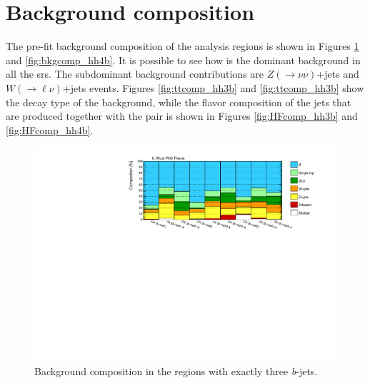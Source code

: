 \section{Background composition}
\label{sec:ewk:bkgcomp}

The pre-fit background composition of the analysis regions is shown in Figures \ref{fig:bkgcomp_hh3b} and \ref{fig:bkgcomp_hh4b}.
It is possible to see how \ttbar is the dominant background in all the \glspl{sr}.
The subdominant background contributions are $Z(\to \nu\nu)$+jets and $W(\to \ell\nu)$+jets events.
Figures \ref{fig:ttcomp_hh3b} and \ref{fig:ttcomp_hh3b} show the decay type of the \ttbar background,
while the flavor composition of the jets that are produced together with the \ttbar pair is shown 
in Figures \ref{fig:HFcomp_hh3b} and \ref{fig:HFcomp_hh4b}.

\begin{figure}[htbp]
\includegraphics[width=\textwidth]{figures/ewk_prod/comp_plots/hh_3b_bkg.pdf}
\caption{Background composition in the regions with exactly three \textit{b}-jets.}
	\label{fig:bkgcomp_hh3b}
\end{figure}

